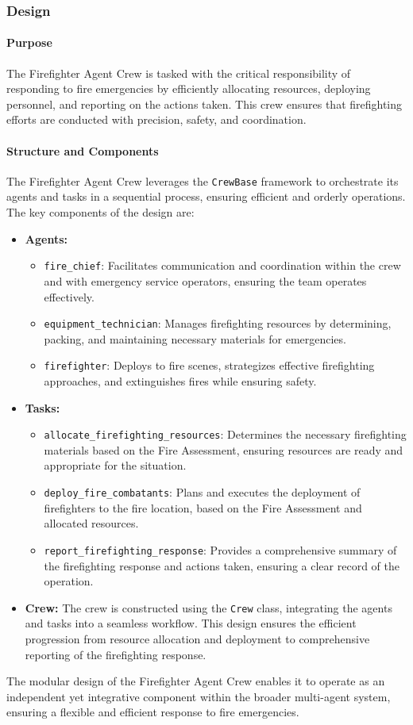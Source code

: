 \subsubsection{Design}

\paragraph{Purpose}
The Firefighter Agent Crew is tasked with the critical responsibility of responding to fire emergencies by efficiently allocating resources, deploying personnel, and reporting on the actions taken. This crew ensures that firefighting efforts are conducted with precision, safety, and coordination.

\paragraph{Structure and Components}
The Firefighter Agent Crew leverages the \texttt{CrewBase} framework to orchestrate its agents and tasks in a sequential process, ensuring efficient and orderly operations. The key components of the design are:

\begin{itemize}
    \item \textbf{Agents:}
    \begin{itemize}
        \item \texttt{fire\_chief}: Facilitates communication and coordination within the crew and with emergency service operators, ensuring the team operates effectively.
        \item \texttt{equipment\_technician}: Manages firefighting resources by determining, packing, and maintaining necessary materials for emergencies.
        \item \texttt{firefighter}: Deploys to fire scenes, strategizes effective firefighting approaches, and extinguishes fires while ensuring safety.
    \end{itemize}
    \item \textbf{Tasks:}
    \begin{itemize}
        \item \texttt{allocate\_firefighting\_resources}: Determines the necessary firefighting materials based on the Fire Assessment, ensuring resources are ready and appropriate for the situation.
        \item \texttt{deploy\_fire\_combatants}: Plans and executes the deployment of firefighters to the fire location, based on the Fire Assessment and allocated resources.
        \item \texttt{report\_firefighting\_response}: Provides a comprehensive summary of the firefighting response and actions taken, ensuring a clear record of the operation.
    \end{itemize}
    \item \textbf{Crew:}
    The crew is constructed using the \texttt{Crew} class, integrating the agents and tasks into a seamless workflow. This design ensures the efficient progression from resource allocation and deployment to comprehensive reporting of the firefighting response.
\end{itemize}

The modular design of the Firefighter Agent Crew enables it to operate as an independent yet integrative component within the broader multi-agent system, ensuring a flexible and efficient response to fire emergencies.
